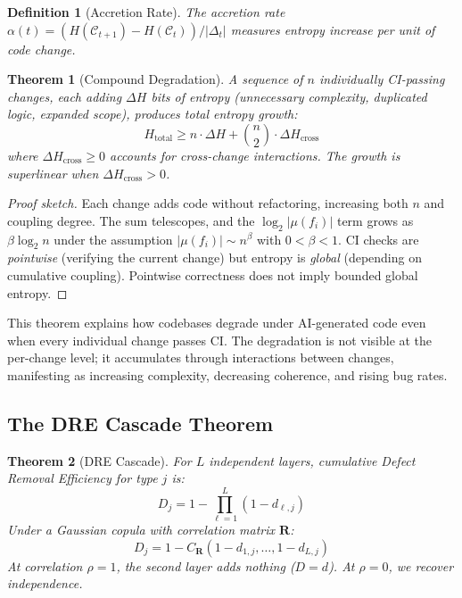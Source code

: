 \documentclass[11pt, a4paper, logo, copyright]{googledeepmind}
\newtheorem{definition}{Definition}[section]
\newtheorem{theorem}{Theorem}[section]
\begin{document}
\begin{definition}[Accretion Rate]
The accretion rate $\alpha(t) = (H(\mathcal{C}_{t+1}) - H(\mathcal{C}_t)) / |\Delta_t|$ measures entropy increase per unit of code change.
\end{definition}

\begin{theorem}[Compound Degradation]
\label{thm:compound-degradation}
A sequence of $n$ individually CI-passing changes, each adding $\Delta H$ bits of entropy (unnecessary complexity, duplicated logic, expanded scope), produces total entropy growth:
\begin{equation}
    H_{\text{total}} \geq n \cdot \Delta H + \binom{n}{2} \cdot \Delta H_{\text{cross}}
\end{equation}
where $\Delta H_{\text{cross}} \geq 0$ accounts for cross-change interactions. The growth is superlinear when $\Delta H_{\text{cross}} > 0$.
\end{theorem}

\begin{proof}[Proof sketch]
Each change adds code without refactoring, increasing both $n$ and coupling degree. The sum telescopes, and the $\log_2 |\mu(f_i)|$ term grows as $\beta \log_2 n$ under the assumption $|\mu(f_i)| \sim n^\beta$ with $0 < \beta < 1$. CI checks are \emph{pointwise} (verifying the current change) but entropy is \emph{global} (depending on cumulative coupling). Pointwise correctness does not imply bounded global entropy.
\end{proof}

This theorem explains how codebases degrade under AI-generated code even when every individual change passes CI. The degradation is not visible at the per-change level; it accumulates through interactions between changes, manifesting as increasing complexity, decreasing coherence, and rising bug rates.

\subsection{The DRE Cascade Theorem}

\begin{theorem}[DRE Cascade]
\label{thm:dre-cascade}
For $L$ independent layers, cumulative Defect Removal Efficiency for type $j$ is:
\begin{equation}
D_j = 1 - \prod_{\ell=1}^{L} (1 - d_{\ell,j})
\end{equation}
Under a Gaussian copula with correlation matrix $\mathbf{R}$:
\begin{equation}
D_j = 1 - C_{\mathbf{R}}(1 - d_{1,j}, \ldots, 1 - d_{L,j})
\end{equation}
At correlation $\rho = 1$, the second layer adds nothing ($D = d$). At $\rho = 0$, we recover independence.
\end{theorem}
\end{document}
